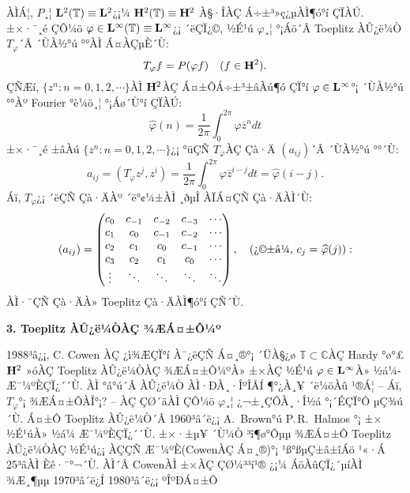 \documentclass[12pt,a4paper,2sided]{article}
\begin{document}
 \vspace{0.8cm}

ÀÌÁ¦, $P$¸¦ ${\bold L}^2(\mathbb T)\equiv{\bold L}^2$¿¡¼­ ${\bold
H}^2(\mathbb T)\equiv {\bold H}^2$ À§·ÎÀÇ Á÷±³»ç¿µÀÌ¶ó°í ÇÏÀÚ.
±×·¯¸é ÇÔ¼ö $\varphi\in{\bold L}^{\infty}(\mathbb T)\equiv {\bold
L}^{\infty}$¿¡ ´ëÇÏ¿©, ½É¹ú $\varphi$¸¦ °¡Áö´Â Toeplitz ÀÛ¿ë¼Ò
$T_\varphi$´Â ´ÙÀ½°ú °°ÀÌ Á¤ÀÇµÈ´Ù:
$$
T_\varphi f=P(\varphi f)\quad\text{($f\in {\bold H}^2$)}.
$$
ÇÑÆí, $\{z^n : n=0,1,2,\cdots \}$ÀÌ ${\bold H}^{2}$ÀÇ Á¤±ÔÁ÷±³±âÀú¶ó
ÇÏ°í $\varphi\in{\bold L}^{\infty}$°¡ ´ÙÀ½°ú °°Àº Fourier °è¼ö¸¦
°¡Áø´Ù°í ÇÏÀÚ:
$$
\widehat\varphi(n)=\frac{1}{2\pi}\int_{0}^{2\pi} \varphi{\overline z}^n dt
$$
±×·¯¸é ±âÀú $\{z^n : n=0,1,2,\cdots\}$¿¡ °üÇÑ $T_\varphi$ÀÇ Çà·Ä $(a_{ij})$´Â ´ÙÀ½°ú °°´Ù:
$$
a_{ij}=(T_{\varphi}z^j,z^i)=\frac{1}{2\pi}\int_{0}^{2\pi} \varphi \overline{z}^{i-j} dt=\widehat\varphi(i-j).
$$
Áï, $T_\varphi$¿¡ ´ëÇÑ Çà·ÄÀº ´ë°¢¼±ÀÌ ¸ðµÎ ÀÏÁ¤ÇÑ Çà·ÄÀÌ´Ù:
$$
(a_{ij})=\begin{pmatrix}
c_0 & c_{-1}& c_{-2}& c_{-3}& \cdots \\
c_1 & c_{0}& c_{-1}& c_{-2}& \cdots \\
c_2 & c_{1}& c_{0}& c_{-1}& \cdots \\
c_3 & c_{2}& c_{1}& c_{0}& \cdots \\
\vdots& \ddots& \ddots& \ddots& \ddots
\end{pmatrix}, \quad \hbox{(¿©±â¼­, $c_{j}=\widehat\varphi(j)$)}:
$$
ÀÌ·¯ÇÑ Çà·ÄÀ» Toeplitz Çà·ÄÀÌ¶ó°í ÇÑ´Ù.





\vspace{.8 cm} {\large\bf 3. Toeplitz ÀÛ¿ë¼ÒÀÇ ¾ÆÁ¤±Ô¼º}

\vspace{.5 cm}


1988³â¿¡, C. Cowen \cite{Cow3}ÀÇ ¿ì¾ÆÇÏ°í À¯¿ëÇÑ Á¤¸®°¡ ´ÜÀ§¿ø
${\mathbb T}\subset{\mathbb C}$ÀÇ Hardy °ø°£ $\bold H^2$ »óÀÇ
Toeplitz ÀÛ¿ë¼ÒÀÇ ¾ÆÁ¤±Ô¼ºÀ» ±×ÀÇ ½É¹ú $\varphi\in \bold
L^{\infty}$À» ½á¼­ Æ¯¼ºÈ­ÇÏ¿´´Ù. ÀÌ °á°ú´Â ÀÛ¿ë¼Ò ÀÌ·ÐÀ¸·ÎºÎÅÍ
¶°¿À¸¥ ´ë¼öÀû ¹®Á¦ -- Áï, $T_{\varphi}$°¡ ¾ÆÁ¤±ÔÀÎ°¡? -- ÀÇ ÇØ´äÀÌ
ÇÔ¼ö $\varphi$¸¦ ¿¬±¸ÇÔÀ¸·Î½á °¡´ÉÇÏ°Ô µÇ¾ú´Ù. Á¤±Ô Toeplitz
ÀÛ¿ë¼Ò´Â 1960³â´ë¿¡ A.\ Brown°ú P.\,R.\ Halmos \cite{BH}°¡ ±× ½É¹úÀ»
½á¼­ Æ¯¼ºÈ­ÇÏ¿´´Ù. ±×·±µ¥ ´Ù¼Ò ³î¶ø°Ôµµ ¾ÆÁ¤±Ô Toeplitz ÀÛ¿ë¼ÒÀÇ
½É¹ú¿¡ ÀÇÇÑ Æ¯¼ºÈ­(CowenÀÇ Á¤¸®)°¡ ¹ß°ßµÇ±â±îÁö ¹«·Á 25³âÀÌ
Èê·¯°¬´Ù. ÀÌ´Â CowenÀÌ ±×ÀÇ ÇØ¼³³í¹® \cite{Cow2}¿¡¼­ ÁöÀûÇÏ¿´µíÀÌ
¾Æ¸¶µµ 1970³â´ë¿Í 1980³â´ë¿¡ ºÎºÐÁ¤±Ô\linebreak
\end{document}

